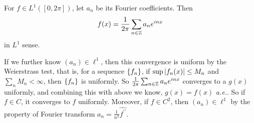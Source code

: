 \begin{enumerate}[label=\arabic*.]
	\begin{thm}
		For $f \in L^1([0,2\pi])$, let $a_n$ be its Fourier coefficients. Then
		\begin{equation*}
			f(x) =  \frac{1}{2\pi} \sum_{n \in \mathbb{Z}} a_ne^{inx}
		\end{equation*}
		in $L^1$ sense.
	\end{thm}
	\begin{rmk}
		If we further know $(a_n) \in \ell^1$, then this convergence is uniform by the Weierstrass test, that is, for a sequence $\left\{f_n\right\}$, if $\sup \left\lvert f_n(x)\right\lvert \leq M_n$ and $\sum_n M_n < \infty$, then  $\left\{f_n\right\}$ is uniformly. So $\frac{1}{2\pi} \sum_{n \in \mathbb{Z}} a_ne^{inx}$ converges to a $g(x)$ uniformly, and combining this with above we know, $g(x) = f(x)$ \emph{a.e.}. So if $f \in C$, it converges to $f$ uniformly. Moreover, if $f \in C^2$, then $(a_n) \in \ell^1$ by the property of Fourier transform $a_n = \frac{1}{n^2}\widehat{f^{\prime\prime}}$.
	\end{rmk}


\end{enumerate}
